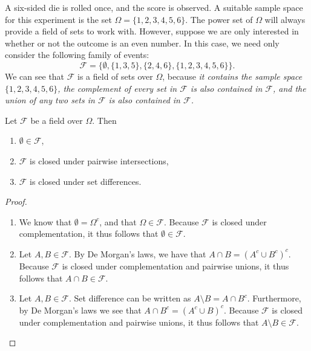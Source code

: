 \break

\begin{example}\label{ex:fields_of_sets}
A six-sided die is rolled once, and the score is observed. A suitable sample space for this experiment is the set 
$\Omega=\{1,2,3,4,5,6\}$. The power set of $\Omega$ will always provide a field of sets to work with. However, suppose we are only interested in whether or not the outcome is an even number. In this case, we need only consider the following family of events:
\[
\mathcal{F} = \big\{\emptyset, \{1,3,5\}, \{2,4,6\}, \{1,2,3,4,5,6\}\big\}.
\]
We can see that $\mathcal{F}$ is a field of sets over $\Omega$, because
\ben
\it it contains the sample space $\{1,2,3,4,5,6\}$,
\it the complement of every set in $\mathcal{F}$ is also contained in $\mathcal{F}$, and
\it the union of any two sets in $\mathcal{F}$ is also contained in $\mathcal{F}$.
\een
\end{example}

\break

\begin{theorem}
Let $\mathcal{F}$ be a field over $\Omega$. Then
\begin{enumerate}
\item $\emptyset\in\mathcal{F}$,
\item $\mathcal{F}$ is closed under pairwise intersections,
\item $\mathcal{F}$ is closed under set differences.
\end{enumerate}
\end{theorem}

\begin{proof}
\begin{enumerate}
\item
We know that $\emptyset = \Omega^c$, and that $\Omega\in\mathcal{F}$. Because $\mathcal{F}$ is closed under complementation, it thus follows that $\emptyset\in\mathcal{F}$.
\item
Let $A,B\in\mathcal{F}$. By De Morgan's laws, we have that $A\cap B = (A^c\cup B^c)^c$. Because $\mathcal{F}$ is closed under complementation and pairwise unions, it thus follows that $A\cap B\in\mathcal{F}$.
\item
Let $A,B\in\mathcal{F}$. Set difference can be written as $A\setminus B = A\cap B^c$. Furthermore, by De Morgan's laws we see that $A\cap B^c = (A^c\cup B)^c$. Because $\mathcal{F}$ is closed under complementation and pairwise unions, it thus follows that $A\setminus B\in\mathcal{F}$.
\end{enumerate}
\end{proof}


